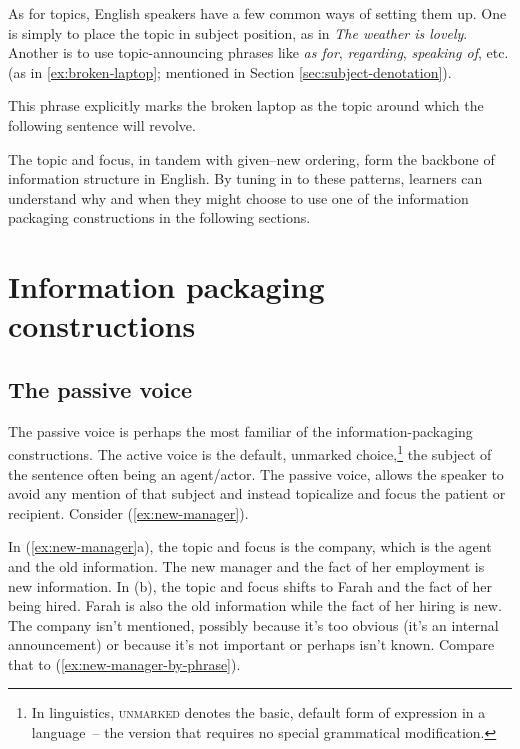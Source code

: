 As for topics, English speakers have a few common ways of setting them up. One is simply to place the topic in subject position, as in \textit{The weather is lovely}. Another is to use topic-announcing phrases like \textit{as for}, \textit{regarding}, \textit{speaking of}, etc. (as in \ref{ex:broken-laptop}; mentioned in Section \ref{sec:subject-denotation}).

\label{ex:broken-laptop}
\z

This phrase explicitly marks the broken laptop as the topic around which the following sentence will revolve.

The topic and focus, in tandem with given--new ordering, form the backbone of information structure in English. By tuning in to these patterns, learners can understand why and when they might choose to use one of the information packaging constructions in the following sections.

\section{Information packaging constructions}

\subsection{The passive voice} \label{sec:passive}

The passive voice is perhaps the most familiar of the information-packaging constructions. The active voice is the default, unmarked choice,\footnote{In linguistics, \textsc{unmarked} denotes the basic, default form of expression in a language~-- the version that requires no special grammatical modification.} the subject of the sentence often being an agent/actor. The passive voice, allows the speaker to avoid any mention of that subject and instead topicalize and focus the patient or recipient. Consider (\ref{ex:new-manager}).

\ea\label{ex:new-manager}
    \z
\z

In (\ref{ex:new-manager}a), the topic and focus is the company, which is the agent and the old information. The new manager and the fact of her employment is new information. In (b), the topic and focus shifts to Farah and the fact of her being hired. Farah is also the old information while the fact of her hiring is new. The company isn't mentioned, possibly because it's too obvious (it's an internal announcement) or because it's not important or perhaps isn't known. Compare that to (\ref{ex:new-manager-by-phrase}).

